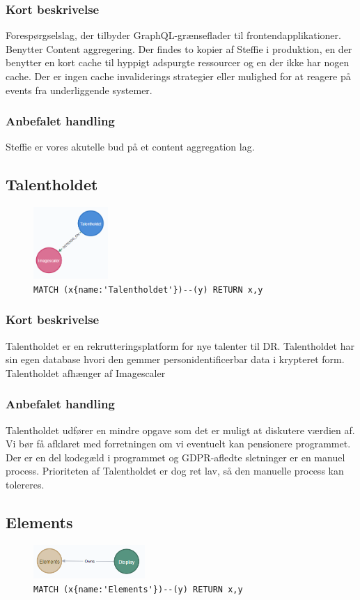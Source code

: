 \documentclass{article}
\begin{document}
\subsubsection*{Kort beskrivelse}
Forespørgselslag, der tilbyder GraphQL-grænseflader til frontendapplikationer.
Benytter Content aggregering. Der findes to kopier af Steffie i produktion, en der benytter en kort cache til hyppigt adspurgte ressourcer og en der ikke har nogen cache. Der er ingen cache invaliderings strategier eller mulighed for at reagere på events fra underliggende systemer.
\subsubsection*{Anbefalet handling}
Steffie er vores akutelle bud på et content aggregation lag.


\subsection{Talentholdet}
\begin{figure}[H]
\includegraphics[width=80pt]{Talentholdet.PNG}
\cprotect\caption{\verb|MATCH (x{name:'Talentholdet'})--(y) RETURN x,y|}
\end{figure}
\subsubsection*{Kort beskrivelse}
Talentholdet er en rekrutteringsplatform for nye talenter til DR. Talentholdet har sin egen database hvori den gemmer personidentificerbar data i krypteret form. Talentholdet afhænger af Imagescaler
\subsubsection*{Anbefalet handling}
Talentholdet udfører en mindre opgave som det er muligt at diskutere værdien af. Vi bør få afklaret med forretningen om vi eventuelt kan pensionere programmet. Der er en del kodegæld i programmet og GDPR-afledte sletninger er en manuel process.
Prioriteten af Talentholdet er dog ret lav, så den manuelle process kan tolereres.


\subsection{Elements}
\begin{figure}[H]
\includegraphics[width=120pt]{Elements.PNG}
\cprotect\caption{\verb|MATCH (x{name:'Elements'})--(y) RETURN x,y|}
\end{figure}
\end{document}
